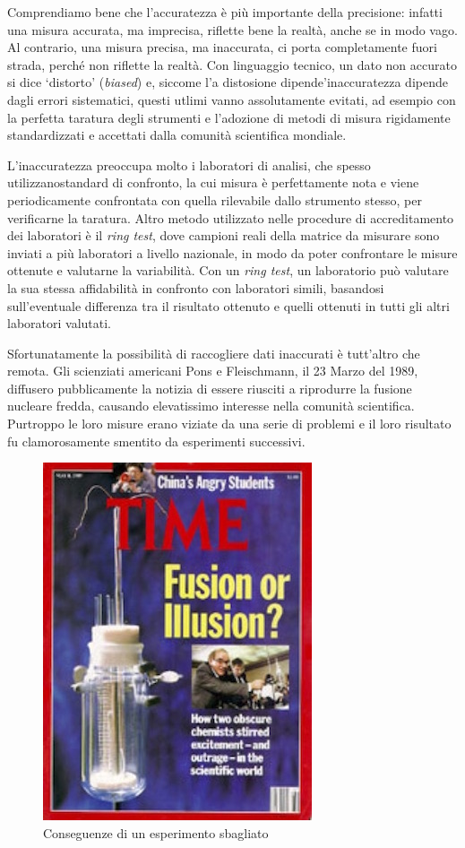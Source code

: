 \documentclass[a4paper,12pt,oneside]{book}
\begin{document}
Comprendiamo bene che l'accuratezza è più importante della precisione: infatti una misura accurata, ma imprecisa, riflette bene la realtà, anche se in modo vago. Al contrario, una misura precisa, ma inaccurata, ci porta completamente fuori strada, perché non riflette la realtà. Con linguaggio tecnico, un dato non accurato si dice `distorto' (\emph{biased}) e, siccome l'a distosione dipende'inaccuratezza dipende dagli errori sistematici, questi utlimi vanno assolutamente evitati, ad esempio con la perfetta taratura degli strumenti e l'adozione di metodi di misura rigidamente standardizzati e accettati dalla comunità scientifica mondiale.

L'inaccuratezza preoccupa molto i laboratori di analisi, che spesso utilizzanostandard di confronto, la cui misura è perfettamente nota e viene periodicamente confrontata con quella rilevabile dallo strumento stesso, per verificarne la taratura. Altro metodo utilizzato nelle procedure di accreditamento dei laboratori è il \emph{ring test}, dove campioni reali della matrice da misurare sono inviati a più laboratori a livello nazionale, in modo da poter confrontare le misure ottenute e valutarne la variabilità. Con un \emph{ring test}, un laboratorio può valutare la sua stessa affidabilità in confronto con laboratori simili, basandosi sull'eventuale differenza tra il risultato ottenuto e quelli ottenuti in tutti gli altri laboratori valutati.

Sfortunatamente la possibilità di raccogliere dati inaccurati è tutt'altro che remota. Gli scienziati americani Pons e Fleischmann, il 23 Marzo del 1989, diffusero pubblicamente la notizia di essere riusciti a riprodurre la fusione nucleare fredda, causando elevatissimo interesse nella comunità scientifica. Purtroppo le loro misure erano viziate da una serie di problemi e il loro risultato fu clamorosamente smentito da esperimenti successivi.

\begin{figure}

{\centering \includegraphics[width=0.5\linewidth]{_images/FalseResults} 

}

\caption{Conseguenze di un esperimento sbagliato}\label{fig:figName2}
\end{figure}
\end{document}
